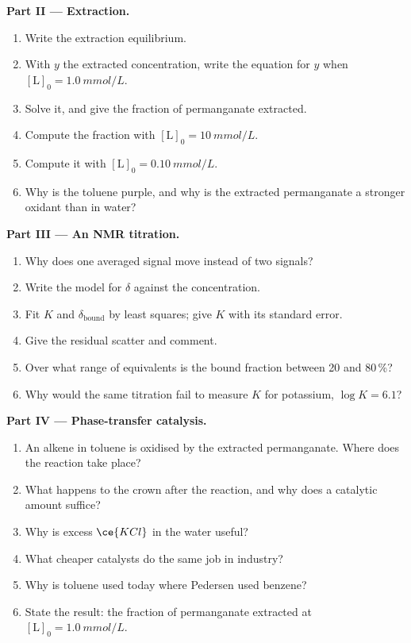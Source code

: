 \begin{problem}
\medskip\noindent\textbf{Part II --- Extraction.}
\begin{enumerate}[resume]
  \item Write the extraction equilibrium.
  \item With $y$ the extracted concentration, write the equation for $y$ when
        $[\mathrm L]_0 = \qty{1.0}{mmol/L}$.
  \item Solve it, and give the fraction of permanganate extracted.
  \item Compute the fraction with $[\mathrm L]_0 = \qty{10}{mmol/L}$.
  \item Compute it with $[\mathrm L]_0 = \qty{0.10}{mmol/L}$.
  \item Why is the toluene purple, and why is the extracted permanganate a stronger
        oxidant than in water?
\end{enumerate}

\medskip\noindent\textbf{Part III --- An NMR titration.}
\begin{enumerate}[resume]
  \item Why does one averaged signal move instead of two signals?
  \item Write the model for $\delta$ against the  concentration.
  \item Fit $K$ and $\delta_{\mathrm{bound}}$ by least squares; give $K$ with its standard error.
  \item Give the residual scatter and comment.
  \item Over what range of equivalents is the bound fraction between 20 and 80\,\%?
  \item Why would the same titration fail to measure $K$ for potassium, $\log K = 6.1$?
\end{enumerate}

\medskip\noindent\textbf{Part IV --- Phase-transfer catalysis.}
\begin{enumerate}[resume]
  \item An alkene in toluene is oxidised by the extracted permanganate. Where does
        the reaction take place?
  \item What happens to the crown after the reaction, and why does a catalytic
        amount suffice?
  \item Why is excess $\ce{KCl}$ in the water useful?
  \item What cheaper catalysts do the same job in industry?
  \item Why is toluene used today where Pedersen used benzene?
  \item State the result: the fraction of permanganate extracted at
        $[\mathrm L]_0 = \qty{1.0}{mmol/L}$.
\end{enumerate}
\end{problem}
